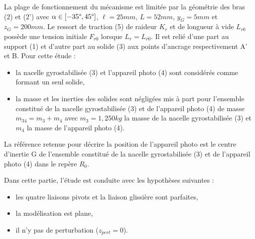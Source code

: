 La plage de fonctionnement du mécanisme est limitée par la géométrie des bras (2) et (2') avec $\alpha\in[-35\degree,45\degree]$, $\ell=25mm$, $L=52mm$, $y_G=5mm$ et $z_G=200mm$.
Le ressort de traction (5) de raideur $K_r$ et de longueur à vide $L_{r0}$ possède une tension initiale $F_{r0}$ lorsque $L_r=L_{r0}$. Il est relié d'une part au support (1) et d'autre part au solide (3) aux points d'ancrage respectivement A' et B.
Pour cette étude :
\begin{itemize}
 \item la nacelle gyrostabilisée (3) et l'appareil photo (4) sont considérés comme formant un seul solide,
 \item la masse et les inerties des solides sont négligées mis à part pour l'ensemble constitué de la nacelle gyrostabilisée (3) et de l'appareil photo (4) de masse $m_{34}=m_3+m_4$ avec $m_3=1,250kg$ la masse de la nacelle gyrostabilisée (3) et $m_4$ la masse de l'appareil photo (4).
\end{itemize}

La référence retenue pour décrire la position de l'appareil photo est le centre d'inertie G de l'ensemble constitué de la nacelle gyrostabilisée (3) et de l'appareil photo (4) dans le repère $R_0$.

Dans cette partie, l'étude est conduite avec les hypothèses suivantes :
\begin{itemize}
 \item les quatre liaisons pivots et la liaison glissière sont parfaites,
 \item la modélisation est plane,
 \item il n'y pas de perturbation ($z_{pert}=0$).
\end{itemize}





